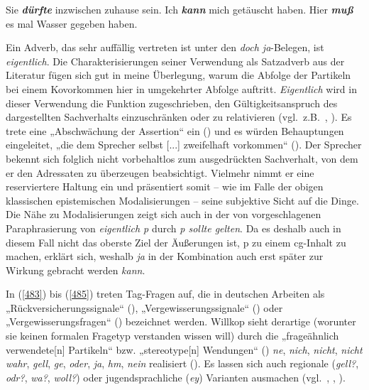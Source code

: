 \begin{exe}
	\ex\label{493} 
		\begin{xlist}	
			\ex\label{493a} Sie \textit{\textbf{dürfte}} inzwischen zuhause sein.
			\hfill\hbox{\citet[29]{Diewald1997}}
			\ex\label{493b} Ich \textit{\textbf{kann}} mich getäuscht haben.	
			\hfill\hbox{\citet[278]{Diewald1999b}}
			\ex\label{493c} Hier \textit{\textbf{muß}} es mal Wasser gegeben haben.
			\hfill\hbox{\citet[67]{Dietrich1992}}			
		\end{xlist}
\end{exe}
Ein Adverb, das sehr auffällig vertreten ist unter den \textit{doch ja}-Belegen, ist \textit{eigentlich}. Die Charakterisierungen seiner Verwendung als Satzadverb  aus der Literatur fügen sich gut in meine Überlegung, warum die Abfolge der Partikeln bei einem Kovorkommen hier in umgekehrter Abfolge auftritt. \textit{Eigentlich} wird in dieser Verwendung die Funktion zugeschrieben, den Gültigkeitsanspruch des dargestellten Sachverhalts einzuschränken oder zu relativieren (vgl.\ z.B.\ \citealt[26]{Albrecht1977}, \citealt[77]{Koenig1990}). Es trete eine „Abschwächung der Assertion“ ein (\citealt[26]{Albrecht1977}) und es würden Behauptungen eingeleitet, „die dem Sprecher selbst [...] zweifelhaft vorkommen“ (\citealt[340]{Reiners1943}). Der Sprecher bekennt sich folglich nicht vorbehaltlos zum ausgedrückten Sachverhalt, von dem er den Adressaten zu überzeugen beabsichtigt. Vielmehr nimmt er eine reserviertere Haltung ein und präsentiert somit – wie im Falle der obigen klassischen epistemischen Modalisierungen – seine subjektive  Sicht auf die Dinge. Die Nähe zu Modalisierungen zeigt sich auch in der von \citet[26]{Albrecht1977} vorgeschlagenen Paraphrasierung von \textit{eigentlich p} durch \textit{p sollte gelten}. Da es deshalb auch in diesem Fall nicht das oberste Ziel der Äußerungen ist, p zu einem cg-Inhalt zu machen, erklärt sich, weshalb \textit{ja} in der Kombination auch erst später zur Wirkung gebracht werden \emph{kann}.
 
In (\ref{483}) bis (\ref{485}) treten Tag-Fragen  auf, die in deutschen Arbeiten als „Rückversicherungssignale“ (\citealt{Schwitalla2002}), „Vergewisserungssignale“ (\citealt{Weinrich2005[1993]}) oder „Vergewisserungsfragen“ (\citealt{Willkop1988}) bezeichnet werden. Willkop sieht derartige   (worunter sie keinen formalen Fragetyp verstanden wissen will) durch die „frageähnlich verwendete[n] Partikeln“ bzw. „ste\-reotype[n] Wendungen“ (\citeyear[70]{Willkop1988}) \textit{ne}, \textit{nich}, \textit{nicht}, \textit{nicht wahr}, \textit{gell}, \textit{ge}, \textit{oder}, \textit{ja}, \textit{hm}, \textit{nein} realisiert (\citeyear[71]{Willkop1988}). Es lassen sich auch regionale (\textit{gell?}, \textit{odr?}, \textit{wa?}, \textit{woll?}) oder jugendsprachliche (\textit{ey}) Varianten ausmachen (vgl.\ \citealt[265]{Schwitalla2002}, \citealt[128]{Imo2011}, \citealt{Frey2010}).
 
